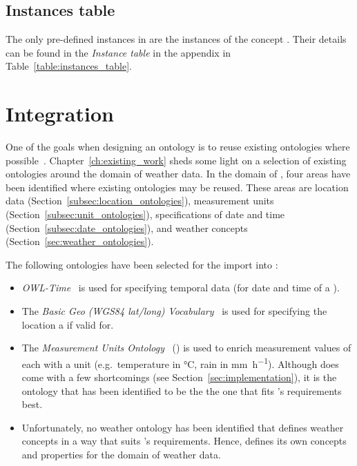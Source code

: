 \subsection{Instances table}
\label{subsec:instances_table}

The only pre-defined instances in \smarthomeweather are the instances of the concept . Their details can be found in the \emph{Instance table} in the appendix in Table~\ref{table:instances_table}.

\section{Integration}
\label{sec:integration}

One of the goals when designing an ontology is to reuse existing ontologies where possible~\cite{reuse1,reuse2}. Chapter~\ref{ch:existing_work} sheds some light on a selection of existing ontologies around the domain of weather data. In the domain of \smarthomeweather, four areas have been identified where existing ontologies may be reused. These areas are location data (Section~\ref{subsec:location_ontologies}), measurement units (Section~\ref{subsec:unit_ontologies}), specifications of date and time (Section~\ref{subsec:date_ontologies}), and weather concepts (Section~\ref{sec:weather_ontologies}).

The following ontologies have been selected for the import into \smarthomeweather:
\begin{itemize}
  \item \emph{OWL-Time}~\cite{owl-time} is used for specifying temporal data (for date and time of a ).
  \item The \emph{Basic Geo (WGS84 lat/long) Vocabulary}~\cite{wgs84_vocabulary} is used for specifying the location a  if valid for.
  \item The \emph{Measurement Units Ontology}~\cite{MUO} (\muo) is used to enrich measurement values of each  with a unit (e.g.\ temperature in \si{\celsius}, rain in \si{\milli\metre\per\hour}). Although \muo does come with a few shortcomings (see Section~\ref{sec:implementation}), it is the ontology that has been identified to be the the one that fits \smarthomeweather's requirements best.
  \item Unfortunately, no weather ontology has been identified that defines weather concepts in a way that suits \smarthomeweather's requirements. Hence, \smarthomeweather defines its own concepts and properties for the domain of weather data.
\end{itemize}


